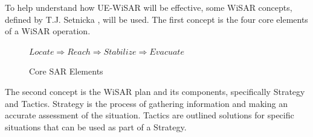 \documentclass[12pt]{IEEEtran}
\begin{document}
To help understand how UE-WiSAR will be effective, some WiSAR
concepts, defined by T.J. Setnicka \cite[p.~35]{setnicka1980}, will be used. 
The first concept is the four core elements of a WiSAR operation.
\begin{figure}[h]
	\begin{center}
		\begin{math}
			Locate \Rightarrow Reach \Rightarrow Stabilize \Rightarrow Evacuate
		\end{math}
	\end{center}
	\caption{Core SAR Elements}
\end{figure}

The second concept is the WiSAR plan and its components, specifically Strategy
and Tactics.  Strategy is the process of gathering information and making an
accurate assessment of the situation.  Tactics are outlined solutions for
specific situations that can be used as part of a Strategy.


\end{document}
